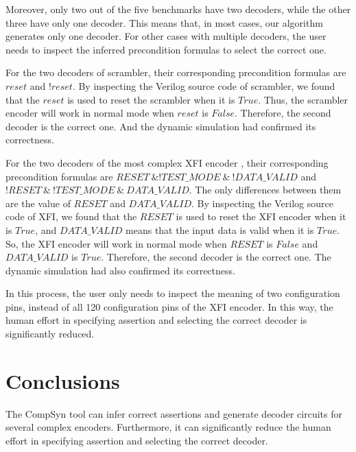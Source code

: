 \documentclass[runningheads,a4paper]{llncs}
\begin{document}
Moreover,
only two out of the five benchmarks have two decoders,
while the other three have only one decoder.
This means that,
in most cases,
our algorithm generates only one decoder.
For other cases with multiple decoders,
the user needs to inspect the inferred precondition formulas to select the correct one.

For the two decoders of scrambler,
their corresponding precondition formulas are $reset$ and $!reset$.
By inspecting the Verilog source code of scrambler,
we found that the $reset$ is used to reset the scrambler when it is $True$.
Thus,
the scrambler encoder will work in normal mode when $reset$ is $False$.
Therefore,
the second decoder is the correct one.
And the dynamic simulation had confirmed its correctness.


For the two decoders of the most complex XFI encoder \cite{IEEE80232002},
their corresponding precondition formulas are $RESET~\& !TEST\_MODE~\&~!DATA\_VALID$ and $!RESET~\&~!TEST\_MODE~\&~DATA\_VALID$.
The only differences between them are the value of $RESET$ and $DATA\_VALID$.
By inspecting the Verilog source code of XFI,
we found that the $RESET$ is used to reset the XFI encoder when it is $True$,
and $DATA\_VALID$ means that the input data is valid when it is $True$.
So,
the XFI encoder will work in normal mode when $RESET$ is $False$ and $DATA\_VALID$ is $True$.
Therefore,
the second decoder is the correct one.
The dynamic simulation had also confirmed its correctness.

In this process,
the user only needs to inspect the meaning of two configuration pins,
instead of all 120 configuration pins of the XFI encoder.
In this way,
the human effort in specifying assertion and selecting the correct decoder is significantly reduced.

\section{Conclusions}\label{sec_conclude}
The CompSyn tool can infer correct assertions and generate decoder circuits for several complex encoders.
Furthermore,
it can significantly reduce the human effort in specifying assertion and selecting the correct decoder.


\end{document}
